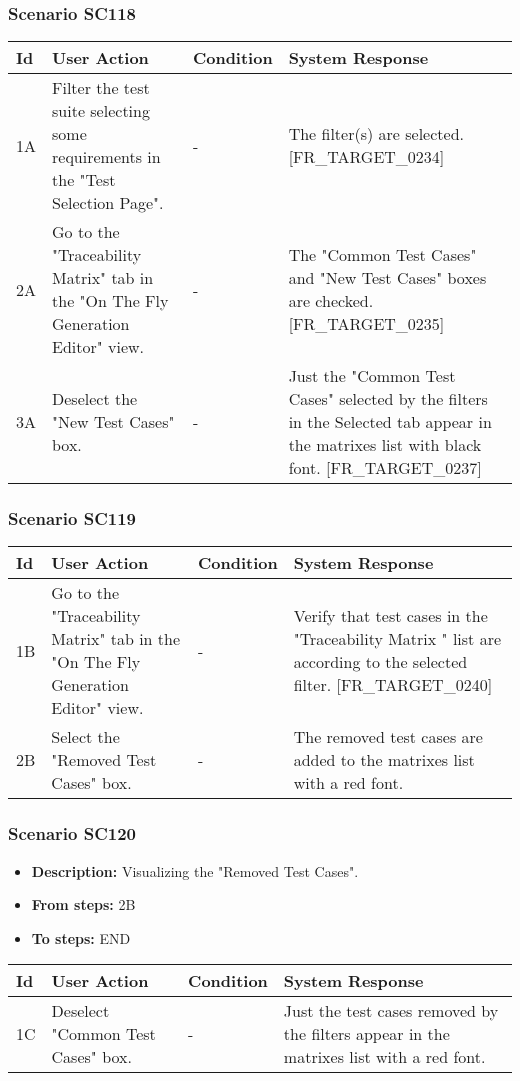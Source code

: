\documentclass[a4paper,11pt]{article}
\newcommand{\bl}{\\ \hline}
\begin{document}
\subsubsection*{Scenario SC118}
\begin{tabular}{|p{0.4in}|p{1.5in}|p{1.5in}|p{1.5in}|}
\hline
Id & User Action & Condition & System Response \bl 
1A & Filter the test suite selecting some requirements in the
						"Test Selection Page". & - & The filter(s) are selected. [FR_TARGET_0234]\bl
2A & Go to the "Traceability Matrix" tab in the "On The Fly
						Generation Editor" view. & - & The "Common Test Cases" and "New Test Cases" boxes are
						checked. [FR_TARGET_0235] \bl
3A & Deselect the "New Test Cases" box. & - & Just the "Common Test Cases" selected by the filters in
						the Selected tab appear in the matrixes list with black font.
						[FR_TARGET_0237]\bl
\end{tabular}
\subsubsection*{Scenario SC119}
\begin{tabular}{|p{0.4in}|p{1.5in}|p{1.5in}|p{1.5in}|}
\hline
Id & User Action & Condition & System Response \bl 
1B & Go to the "Traceability Matrix" tab in the "On The Fly
						Generation Editor" view. & - & Verify that test cases in the "Traceability Matrix " list
						are according to the selected filter. [FR_TARGET_0240] \bl
2B & Select the "Removed Test Cases" box. & - & The removed test cases are added to the matrixes list
						with a red font.\bl
\end{tabular}
\subsubsection*{Scenario SC120}
\begin{itemize}
\item {\bf Description:} Visualizing the "Removed Test Cases".
\item {\bf From steps:} 2B
\item {\bf To steps:} END
\end{itemize}
\begin{tabular}{|p{0.4in}|p{1.5in}|p{1.5in}|p{1.5in}|}
\hline
Id & User Action & Condition & System Response \bl 
1C & Deselect "Common Test Cases" box. & - & Just the test cases removed by the filters appear in the
						matrixes list with a red font.\bl
\end{tabular}
\end{document}

